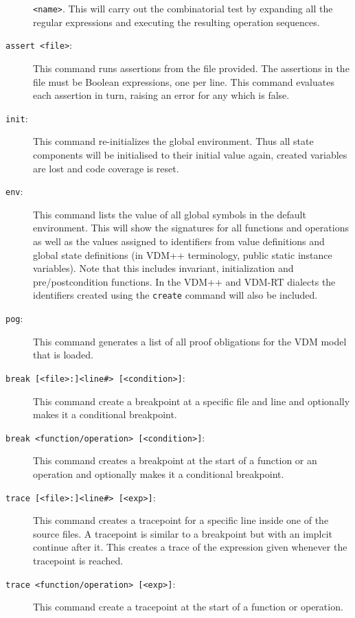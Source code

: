 \documentclass{overturerepsec}
\begin{document}
\begin{description}
  \texttt{<name>}. This will carry out the combinatorial
  test by expanding all the regular expressions and executing the resulting
  operation sequences. 
\item[\texttt{assert <file>}:] This command runs assertions from the
  file provided. The assertions in the file must be Boolean
  expressions, one per line. This command evaluates each assertion in
  turn, raising an error for any which is false.  
\item[\texttt{init}:] This command re-initializes the global
  environment. Thus all state components will be initialised to their
  initial value again, created variables are lost and code coverage
  is reset. 
\item[\texttt{env}:] This command lists the value of all global symbols
  in the default environment. This will show the signatures for all
  functions and operations as well as the values assigned to
  identifiers from value definitions and global state definitions (in VDM++
  terminology, public static instance variables). Note that this includes invariant,
  initialization and pre/postcondition functions. In the VDM++ and
  VDM-RT dialects the identifiers created using the \texttt{create}
  command will also be included. 
\item[\texttt{pog}:] This command generates a list of all proof
  obligations for the VDM model that is
  loaded.  
\item[\texttt{break [<file>:]<line\#> [<condition>]}:] This command
  create a breakpoint at a specific file and line and optionally makes
  it a conditional breakpoint.  
\item[\texttt{break <function/operation> [<condition>]}:] This command
  creates a breakpoint at the start of a function or an operation and
  optionally makes it a conditional breakpoint. 
\item[\texttt{trace [<file>:]<line\#> [<exp>]}:] This command creates a
  tracepoint for a specific line inside one of the source files. A
  tracepoint is similar to a breakpoint but with an implcit continue
  after it. This creates a trace of the expression given
  whenever the tracepoint is reached.  
\item[\texttt{trace <function/operation> [<exp>]}:] This command
  create a tracepoint at the start of a function or operation.

\end{description}
\end{document}
